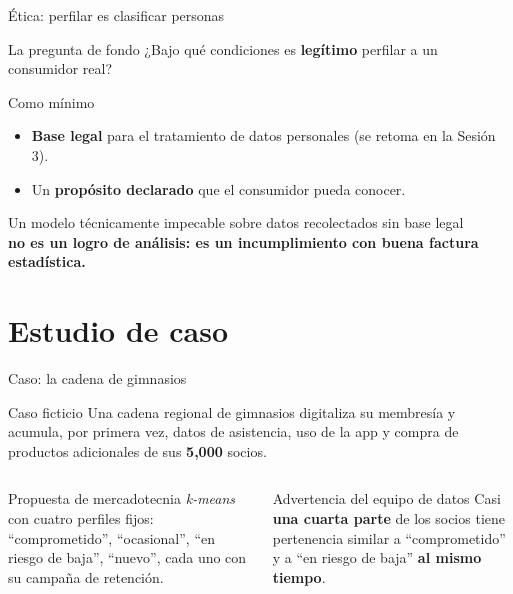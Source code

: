 \documentclass[aspectratio=169,xcolor=dvipsnames]{beamer}
\begin{document}
\begin{frame}{Ética: perfilar es clasificar personas}
\begin{alertblock}{La pregunta de fondo}
  ¿Bajo qué condiciones es \textbf{legítimo} perfilar a un consumidor real?
\end{alertblock}
\begin{block}{Como mínimo}
  \begin{itemize}
    \item \textbf{Base legal} para el tratamiento de datos personales (se retoma en la Sesión 3).
    \item Un \textbf{propósito declarado} que el consumidor pueda conocer.
  \end{itemize}
\end{block}
\vspace{4pt}
\begin{center}
  Un modelo técnicamente impecable sobre datos recolectados sin base legal\\
  \textbf{no es un logro de análisis: es un incumplimiento con buena factura estadística.}
\end{center}
\end{frame}

\section[Caso]{Estudio de caso}

\begin{frame}{Caso: la cadena de gimnasios}
\begin{exampleblock}{Caso ficticio}
  Una cadena regional de gimnasios digitaliza su membresía y acumula, por primera vez, datos de asistencia, uso de la app y compra de productos adicionales de sus \textbf{5{,}000} socios.
\end{exampleblock}
\begin{columns}[T]
  \begin{block}{Propuesta de mercadotecnia}
    \small \textit{k-means} con cuatro perfiles fijos: \enquote{comprometido}, \enquote{ocasional}, \enquote{en riesgo de baja}, \enquote{nuevo}, cada uno con su campaña de retención.
  \end{block}
  \begin{alertblock}{Advertencia del equipo de datos}
    \small Casi \textbf{una cuarta parte} de los socios tiene pertenencia similar a \enquote{comprometido} y a \enquote{en riesgo de baja} \textbf{al mismo tiempo}.
  \end{alertblock}
\end{columns}
\end{frame}
\end{document}
